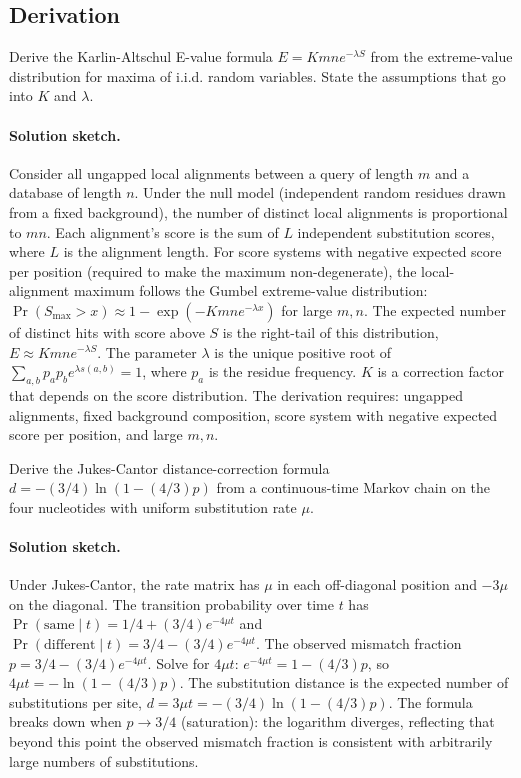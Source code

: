 \subsection*{Derivation}

\begin{exercise}
Derive the Karlin-Altschul E-value formula
$E = K m n e^{-\lambda S}$ from the extreme-value distribution for
maxima of i.i.d. random variables. State the assumptions that go into
$K$ and $\lambda$.

\paragraph{Solution sketch.}
Consider all ungapped local alignments between a query of length $m$
and a database of length $n$. Under the null model (independent random
residues drawn from a fixed background), the number of distinct local
alignments is proportional to $m n$. Each alignment's score is the sum
of $L$ independent substitution scores, where $L$ is the alignment
length. For score systems with negative expected score per position
(required to make the maximum non-degenerate), the local-alignment
maximum follows the Gumbel extreme-value distribution: $\Pr(S_{\max} >
x) \approx 1 - \exp(-K m n e^{-\lambda x})$ for large $m, n$. The
expected number of distinct hits with score above $S$ is the
right-tail of this distribution, $E \approx K m n e^{-\lambda S}$.
The parameter $\lambda$ is the unique positive root of $\sum_{a,b}
p_{a} p_{b} e^{\lambda s(a,b)} = 1$, where $p_{a}$ is the residue
frequency. $K$ is a correction factor that depends on the score
distribution. The derivation requires: ungapped alignments, fixed
background composition, score system with negative expected score per
position, and large $m, n$.
\end{exercise}

\begin{exercise}
Derive the Jukes-Cantor distance-correction formula
$d = -(3/4) \ln(1 - (4/3)p)$ from a continuous-time Markov chain on
the four nucleotides with uniform substitution rate $\mu$.

\paragraph{Solution sketch.}
Under Jukes-Cantor, the rate matrix has $\mu$ in each off-diagonal
position and $-3\mu$ on the diagonal. The transition probability over
time $t$ has $\Pr(\text{same}\mid t) = 1/4 + (3/4) e^{-4\mu t}$ and
$\Pr(\text{different} \mid t) = 3/4 - (3/4) e^{-4\mu t}$. The observed
mismatch fraction $p = 3/4 - (3/4) e^{-4\mu t}$. Solve for $4\mu t$:
$e^{-4\mu t} = 1 - (4/3) p$, so $4\mu t = -\ln(1 - (4/3) p)$. The
substitution distance is the expected number of substitutions per
site, $d = 3\mu t = -(3/4) \ln(1 - (4/3) p)$. The formula breaks down
when $p \to 3/4$ (saturation): the logarithm diverges, reflecting that
beyond this point the observed mismatch fraction is consistent with
arbitrarily large numbers of substitutions.
\end{exercise}

